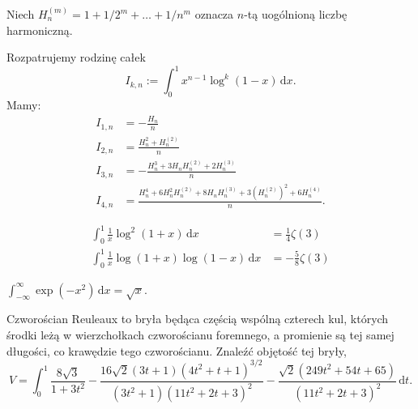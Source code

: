 %
Niech $H_{n}^{(m)} = 1 + 1/2^m + \ldots + 1/n^m$ oznacza $n$-tą uogólnioną liczbę harmoniczną.

\begin{problem}    
    Rozpatrujemy rodzinę całek
    \begin{equation}
        I_{k,n} := \int_0^1 x^{n-1} \log^k (1-x) \,\mathrm{d} x.
    \end{equation}
    Mamy:
    \begin{align}
        I_{1,n} & = - \frac{H_n}{n} \\
        I_{2,n} & = \frac{H_n^2 + H_n^{(2)}}{n} \\
        I_{3,n} & = - \frac{H_n^3 + 3H_nH_n^{(2)} + 2H_n^{(3)}}{n} \\
        I_{4,n} & = \frac{H_n^4 + 6H_n^2 H_n^{(2)} + 8H_nH_n^{(3)} + 3(H_n^{(2)})^2 + 6H_n^{(4)}}{n}.
    \end{align}
\end{problem}

\begin{problem}
    \begin{align}
        \int_0^1 \frac{1}{x} \log^2 (1+x) \,\mathrm{d}x & = \frac{1}{4} \zeta(3) \\
        \int_0^1 \frac{1}{x} \log (1+x) \log (1-x) \,\mathrm{d}x & = -\frac{5}{8} \zeta(3)
    \end{align}
\end{problem}

\begin{problem}
    $\int_{-\infty}^\infty \exp(-x^2) \,\mathrm{d}x = \sqrt x$.
\end{problem}

\begin{problem}
    \label{reuleaux_tetrahedron}%
    Czworościan Reuleaux to bryła będąca częścią wspólną czterech kul, których środki leżą w wierzchołkach czworościanu foremnego, a promienie są tej samej długości, co krawędzie tego czworościanu.
    Znaleźć objętość tej bryły,
    \begin{equation}
        V = \int_0^1
        \frac{
            8\sqrt{3}
        }{
            1 + 3t^2
        } - \frac{
            16 \sqrt{2} (3t+1) (4t^2 +t+1)^{3/2}
        }{
            (3t^2+1)(11t^2 + 2t + 3)^2
        } - \frac{
            \sqrt{2} (249 t^2 + 54t + 65)
        }{
            (11t^2 + 2t +3)^2
        } \,\mathrm{d} t.
    \end{equation}
\end{problem}

